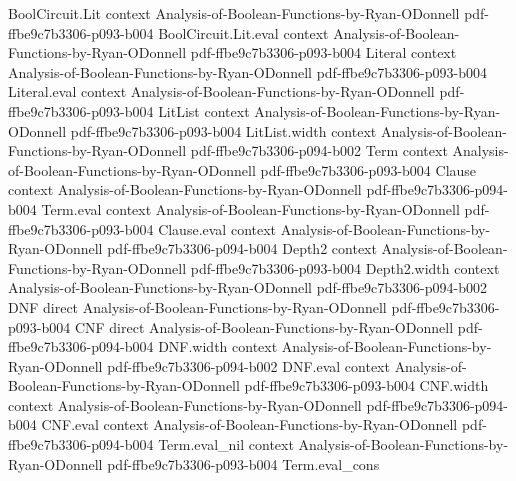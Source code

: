 \begin{lemma}
\leanok
{}
\proofstep
  {BoolCircuit.Lit}
  {context}
  {Analysis-of-Boolean-Functions-by-Ryan-ODonnell}
  {pdf-ffbe9c7b3306-p093-b004}
\proofstep
  {BoolCircuit.Lit.eval}
  {context}
  {Analysis-of-Boolean-Functions-by-Ryan-ODonnell}
  {pdf-ffbe9c7b3306-p093-b004}
\proofstep
  {Literal}
  {context}
  {Analysis-of-Boolean-Functions-by-Ryan-ODonnell}
  {pdf-ffbe9c7b3306-p093-b004}
\proofstep
  {Literal.eval}
  {context}
  {Analysis-of-Boolean-Functions-by-Ryan-ODonnell}
  {pdf-ffbe9c7b3306-p093-b004}
\proofstep
  {LitList}
  {context}
  {Analysis-of-Boolean-Functions-by-Ryan-ODonnell}
  {pdf-ffbe9c7b3306-p093-b004}
\proofstep
  {LitList.width}
  {context}
  {Analysis-of-Boolean-Functions-by-Ryan-ODonnell}
  {pdf-ffbe9c7b3306-p094-b002}
\proofstep
  {Term}
  {context}
  {Analysis-of-Boolean-Functions-by-Ryan-ODonnell}
  {pdf-ffbe9c7b3306-p093-b004}
\proofstep
  {Clause}
  {context}
  {Analysis-of-Boolean-Functions-by-Ryan-ODonnell}
  {pdf-ffbe9c7b3306-p094-b004}
\proofstep
  {Term.eval}
  {context}
  {Analysis-of-Boolean-Functions-by-Ryan-ODonnell}
  {pdf-ffbe9c7b3306-p093-b004}
\proofstep
  {Clause.eval}
  {context}
  {Analysis-of-Boolean-Functions-by-Ryan-ODonnell}
  {pdf-ffbe9c7b3306-p094-b004}
\proofstep
  {Depth2}
  {context}
  {Analysis-of-Boolean-Functions-by-Ryan-ODonnell}
  {pdf-ffbe9c7b3306-p093-b004}
\proofstep
  {Depth2.width}
  {context}
  {Analysis-of-Boolean-Functions-by-Ryan-ODonnell}
  {pdf-ffbe9c7b3306-p094-b002}
\proofstep
  {DNF}
  {direct}
  {Analysis-of-Boolean-Functions-by-Ryan-ODonnell}
  {pdf-ffbe9c7b3306-p093-b004}
\proofstep
  {CNF}
  {direct}
  {Analysis-of-Boolean-Functions-by-Ryan-ODonnell}
  {pdf-ffbe9c7b3306-p094-b004}
\proofstep
  {DNF.width}
  {context}
  {Analysis-of-Boolean-Functions-by-Ryan-ODonnell}
  {pdf-ffbe9c7b3306-p094-b002}
\proofstep
  {DNF.eval}
  {context}
  {Analysis-of-Boolean-Functions-by-Ryan-ODonnell}
  {pdf-ffbe9c7b3306-p093-b004}
\proofstep
  {CNF.width}
  {context}
  {Analysis-of-Boolean-Functions-by-Ryan-ODonnell}
  {pdf-ffbe9c7b3306-p094-b004}
\proofstep
  {CNF.eval}
  {context}
  {Analysis-of-Boolean-Functions-by-Ryan-ODonnell}
  {pdf-ffbe9c7b3306-p094-b004}
\proofstep
  {Term.eval_nil}
  {context}
  {Analysis-of-Boolean-Functions-by-Ryan-ODonnell}
  {pdf-ffbe9c7b3306-p093-b004}
\proofstep
  {Term.eval_cons}

\end{lemma}
